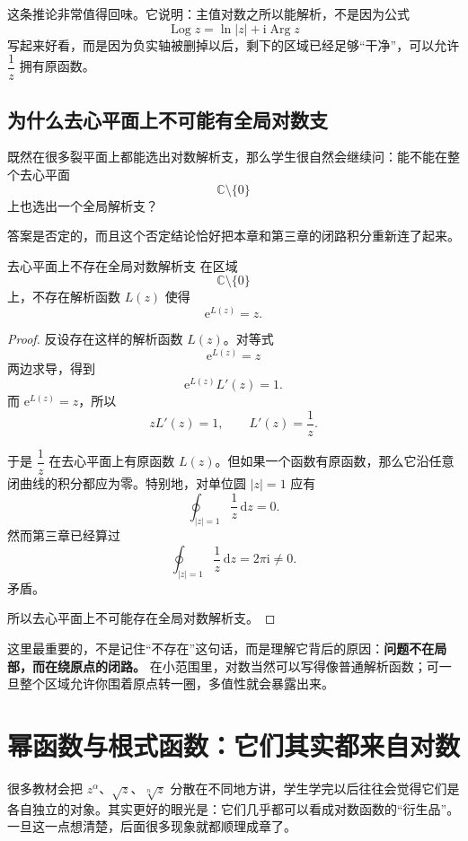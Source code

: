 \begin{zhu}{}{}
这条推论非常值得回味。它说明：主值对数之所以能解析，不是因为公式
\[
    \operatorname{Log} z=\ln|z|+\mathrm{i}\operatorname{Arg} z
\]
写起来好看，而是因为负实轴被删掉以后，剩下的区域已经足够``干净''，可以允许 $\dfrac{1}{z}$ 拥有原函数。
\end{zhu}

\subsection{为什么去心平面上不可能有全局对数支}

既然在很多裂平面上都能选出对数解析支，那么学生很自然会继续问：能不能在整个去心平面
\[
    \mathbb{C}\setminus\{0\}
\]
上也选出一个全局解析支？

答案是否定的，而且这个否定结论恰好把本章和第三章的闭路积分重新连了起来。

\begin{dingli}{去心平面上不存在全局对数解析支}{}
在区域
\[
    \mathbb{C}\setminus\{0\}
\]
上，不存在解析函数 $L(z)$ 使得
\[
    \mathrm{e}^{L(z)}=z.
\]
\end{dingli}

\begin{proof}
反设存在这样的解析函数 $L(z)$。对等式
\[
    \mathrm{e}^{L(z)}=z
\]
两边求导，得到
\[
    \mathrm{e}^{L(z)}L'(z)=1.
\]
而 $\mathrm{e}^{L(z)}=z$，所以
\[
    zL'(z)=1,
\qquad
    L'(z)=\frac{1}{z}.
\]

于是 $\dfrac{1}{z}$ 在去心平面上有原函数 $L(z)$。但如果一个函数有原函数，那么它沿任意闭曲线的积分都应为零。特别地，对单位圆 $|z|=1$ 应有
\[
    \oint_{|z|=1}\frac{1}{z}\,\mathrm{d}z=0.
\]
然而第三章已经算过
\[
    \oint_{|z|=1}\frac{1}{z}\,\mathrm{d}z=2\pi\mathrm{i}\neq 0.
\]
矛盾。

所以去心平面上不可能存在全局对数解析支。
\end{proof}

\begin{tishi}[这一结论真正想说明什么]
这里最重要的，不是记住``不存在''这句话，而是理解它背后的原因：\textbf{问题不在局部，而在绕原点的闭路。} 在小范围里，对数当然可以写得像普通解析函数；可一旦整个区域允许你围着原点转一圈，多值性就会暴露出来。
\end{tishi}

\section{幂函数与根式函数：它们其实都来自对数}

\begin{wulibj}[为什么这一节要紧接对数]
很多教材会把 $z^\alpha$、$\sqrt{z}$、$\sqrt[n]{z}$ 分散在不同地方讲，学生学完以后往往会觉得它们是各自独立的对象。其实更好的眼光是：它们几乎都可以看成对数函数的``衍生品''。一旦这一点想清楚，后面很多现象就都顺理成章了。
\end{wulibj}

